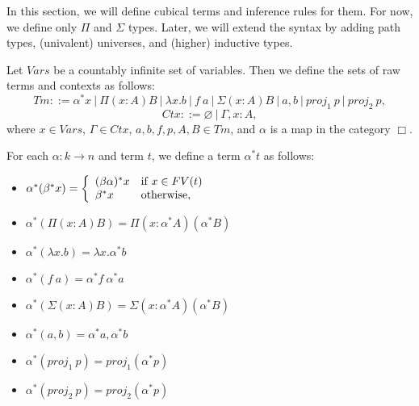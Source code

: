 \documentclass{amsart}
\theoremstyle{definition}
\theoremstyle{remark}
\numberwithin{table}{section}
\begin{document}
In this section, we will define cubical terms and inference rules for them.
For now, we define only $\Pi$ and $\Sigma$ types.
Later, we will extend the syntax by adding path types, (univalent) universes, and (higher) inductive types.

Let $Vars$ be a countably infinite set of variables.
Then we define the sets of raw terms and contexts as follows:
\[ Tm ::= \alpha^* x\ |\ \Pi (x : A) B\ |\ \lambda x. b\ |\ f\ a\ |\ \Sigma (x : A) B\ |\ a , b\ |\ proj_1\ p\ |\ proj_2\ p, \]
\[ Ctx ::= \varnothing\ |\ \Gamma, x : A, \]
where $x \in Vars$, $\Gamma \in Ctx$, $a, b, f, p, A, B \in Tm$, and $\alpha$ is a map in the category $\Box$.

For each $\alpha : k \to n$ and term $t$, we define a term $\alpha^* t$ as follows:
\begin{itemize}
\item[] $\alpha^* (\beta^* x) = \left\{\begin{array}{l l}
            (\beta \alpha)^* x  & \text{if $x \in FV(t)$} \\
            \beta^* x           & \text{otherwise,}
        \end{array} \right.$
\item[] $\alpha^* (\Pi (x : A) B) = \Pi (x : \alpha^* A) (\alpha^* B)$
\item[] $\alpha^* (\lambda x. b) = \lambda x. \alpha^* b$
\item[] $\alpha^* (f\ a) = \alpha^* f\ \alpha^* a$
\item[] $\alpha^* (\Sigma (x : A) B) = \Sigma (x : \alpha^* A) (\alpha^* B)$
\item[] $\alpha^* (a , b) = \alpha^* a , \alpha^* b$
\item[] $\alpha^* (proj_1\ p) = proj_1 (\alpha^* p)$
\item[] $\alpha^* (proj_2\ p) = proj_2 (\alpha^* p)$
\end{itemize}

\centerAlignProof
\end{document}
